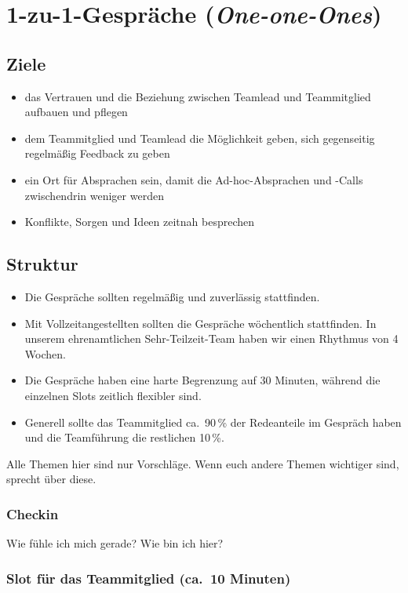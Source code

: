 \section{1-zu-1-Gespräche (\emph{One-one-Ones})}
\label{1-zu-1}

\subsection{Ziele}

\begin{itemize}
 \item das Vertrauen und die Beziehung zwischen Teamlead und Teammitglied aufbauen und pflegen
 \item dem Teammitglied und Teamlead die Möglichkeit geben, sich gegenseitig regelmäßig Feedback zu geben
 \item ein Ort für Absprachen sein, damit die Ad-hoc-Absprachen und -Calls zwischendrin weniger werden
 \item Konflikte, Sorgen und Ideen zeitnah besprechen
\end{itemize}

\subsection{Struktur}

\begin{itemize}
 \item Die Gespräche sollten regelmäßig und zuverlässig stattfinden.
 \item Mit Vollzeitangestellten sollten die Gespräche wöchentlich stattfinden. In unserem ehrenamtlichen Sehr-Teilzeit-Team haben wir einen Rhythmus von 4 Wochen.
 \item Die Gespräche haben eine harte Begrenzung auf 30 Minuten, während die einzelnen Slots zeitlich flexibler sind.
 \item Generell sollte das Teammitglied ca.~90\,\% der Redeanteile im Gespräch haben und die Teamführung die restlichen 10\,\%.
\end{itemize}

Alle Themen hier sind nur Vorschläge. Wenn euch andere Themen wichtiger sind, sprecht über diese.

\subsubsection{Checkin}
Wie fühle ich mich gerade? Wie bin ich hier?

\subsubsection{Slot für das Teammitglied (ca.~10 Minuten)}

